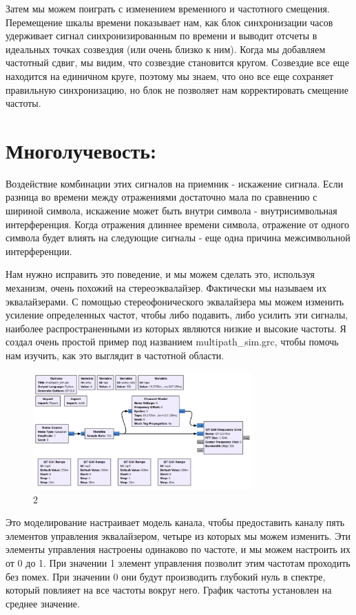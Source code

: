 \documentclass[10pt,a4paper,oneside]{article}
\begin{document}
Затем мы можем поиграть с изменением временного и частотного смещения. Перемещение шкалы времени показывает нам, как блок синхронизации часов удерживает сигнал синхронизированным по времени и выводит отсчеты в идеальных точках созвездия (или очень близко к ним). Когда мы добавляем частотный сдвиг, мы видим, что созвездие становится кругом. Созвездие все еще находится на единичном круге, поэтому мы знаем, что оно все еще сохраняет правильную синхронизацию, но блок не позволяет нам корректировать смещение частоты.

\section{Многолучевость:}

Воздействие комбинации этих сигналов на приемник - искажение сигнала. Если разница во времени между отражениями достаточно мала по сравнению с шириной символа, искажение может быть внутри символа - внутрисимвольная интерференция. Когда отражения длиннее времени символа, отражение от одного символа будет влиять на следующие сигналы - еще одна причина межсимвольной интерференции.

Нам нужно исправить это поведение, и мы можем сделать это, используя механизм, очень похожий на стереоэквалайзер. Фактически мы называем их эквалайзерами. С помощью стереофонического эквалайзера мы можем изменить усиление определенных частот, чтобы либо подавить, либо усилить эти сигналы, наиболее распространенными из которых являются низкие и высокие частоты. Я создал очень простой пример под названием multipath_sim.grc, чтобы помочь нам изучить, как это выглядит в частотной области.

\begin{figure}[H]
        \centering
        \includegraphics[width=0.75\textwidth]{pics/17.png}
        \caption{2}
        \label{fig:first}
\end{figure}

Это моделирование настраивает модель канала, чтобы предоставить каналу пять элементов управления эквалайзером, четыре из которых мы можем изменить. Эти элементы управления настроены одинаково по частоте, и мы можем настроить их от 0 до 1. При значении 1 элемент управления позволит этим частотам проходить без помех. При значении 0 они будут производить глубокий нуль в спектре, который повлияет на все частоты вокруг него. График частоты установлен на среднее значение.
\end{document}

